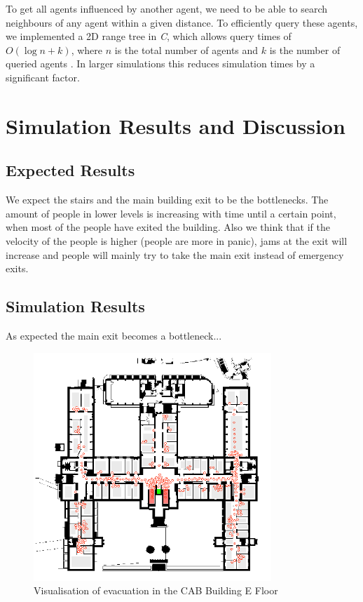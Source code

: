 \documentclass[11pt]{article}
\begin{document}
To get all agents influenced by another agent, we need to be able
to search neighbours of any agent within a given distance. To efficiently query 
these agents, we implemented a 2D range tree in \textit{C}, which allows query times
of $O(\log n+k)$, where $n$ is the total number of agents and $k$ is the number of
queried agents \cite{algdat}. In larger simulations this reduces simulation times by a significant factor.

\section{Simulation Results and Discussion}

\subsection{Expected Results}

We expect the stairs and the main building exit to be the bottlenecks. The
amount of people in lower levels is increasing with time until a certain point,
when most of the people have exited the building. Also we think that if the 
velocity of the people is higher (people are more in panic), jams at the
exit will increase and people will mainly try to take the main exit instead of
emergency exits.

\subsection{Simulation Results}

As expected the main exit becomes a bottleneck...

\begin{figure}[h]
\centering
\includegraphics[width=0.8\textwidth]{./images/cab1.png}
\caption{Visualisation of evacuation in the CAB Building E Floor} 
\label{cab1}
\end{figure}
\end{document}

